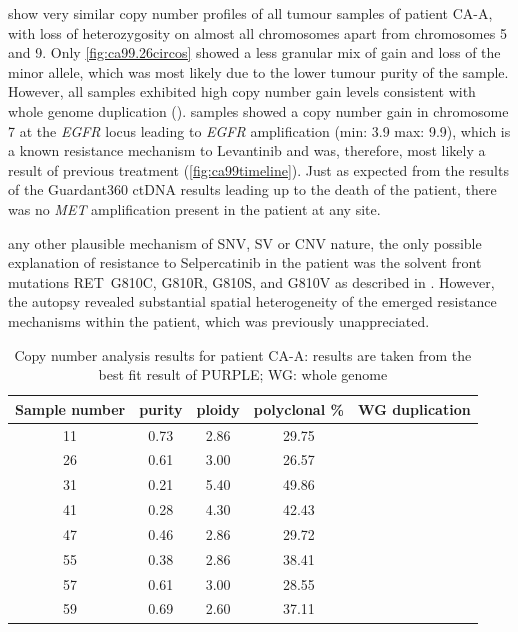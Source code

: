  show very similar copy number profiles of all tumour samples of patient CA-A, with loss of heterozygosity on almost all chromosomes apart from chromosomes 5 and 9. Only \autoref{fig:ca99.26circos} showed a less granular mix of gain and loss of the minor allele, which was most likely due to the lower tumour purity of the sample. However, all samples exhibited high copy number gain levels consistent with whole genome duplication ().  samples showed a copy number gain in chromosome 7 at the \textit{EGFR} locus leading to \textit{EGFR} amplification (min: 3.9 max: 9.9), which is a known resistance mechanism to Levantinib \cite{Jin2021} and was, therefore, most likely a result of previous treatment (\autoref{fig:ca99timeline}). Just as expected from the results of the Guardant360 ctDNA results leading up to the death of the patient, there was no \textit{MET} amplification present in the patient at any site.

 any other plausible mechanism of SNV, SV or CNV nature, the only possible explanation of resistance to Selpercatinib in the patient was the solvent front mutations RET~G810C, G810R, G810S, and G810V as described in \textcite{Solomon2020}. However, the autopsy revealed substantial spatial heterogeneity of the emerged resistance mechanisms within the patient, which was previously unappreciated.

\begin{table}[ht]
\caption[Copy number analysis results for patient CA-A]{Copy number analysis results for patient CA-A: results are taken from the best fit result of PURPLE; WG: whole genome}\label{tab:ca99cnv}
\centering
{}
\begin{tabular}{|c|c|c|c|c|}
\toprule
\hline
 \rowcolor{gray!50}
\textbf{Sample number} & \textbf{purity} & \textbf{ploidy} & \textbf{polyclonal \%} & \textbf{WG duplication}\\
\hline
 11 & \num{0.73} &	 \num{2.86} &	\num{29.75} & \cellcolor{white}	\\
 26 & \num{0.61} & \num{3.00} & \num{26.57} & \cellcolor{white} \\
 31 & \num{0.21} & \num{5.40} & \num{49.86} & \cellcolor{white} \\
 41 & \num{0.28} & \num{4.30} & \num{42.43} & \cellcolor{white} \\
 47 & \num{0.46} & \num{2.86} & \num{29.72} & \cellcolor{white} \\
 55 & \num{0.38} & \num{2.86} & \num{38.41} & \cellcolor{white} \\
 57 & \num{0.61} & \num{3.00} & \num{28.55} & \cellcolor{white} \\
 59 & \num{0.69} & \num{2.60} & \num{37.11} & \cellcolor{white}\multirow{-8}{*}{True} \\
 \hline
\bottomrule
\end{tabular}
\end{table} 



